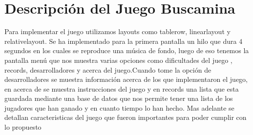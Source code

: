 \newpage


\section{Descripción del Juego Buscamina}
Para implementar el juego utilizamos layouts como tablerow, linearlayout y relativelayout. Se ha implementado para la primera pantalla un hilo que dura 4 segundos en los cuales se reproduce una música de fondo, luego de eso tenemos la pantalla menú que nos muestra varias opciones como dificultades del juego , records, desarrolladores y acerca del juego.Cuando tome la opción de desarrolladores se muestra información acerca de los que implementaron el juego, en acerca de se muestra instrucciones del juego y en records una lista que esta guardada mediante una base de datos que nos permite tener una lista de los jugadores que han ganado y en cuanto tiempo lo han hecho. Mas adelante se detallan caracteristicas del juego que fueron importantes para poder cumplir con lo propuesto







